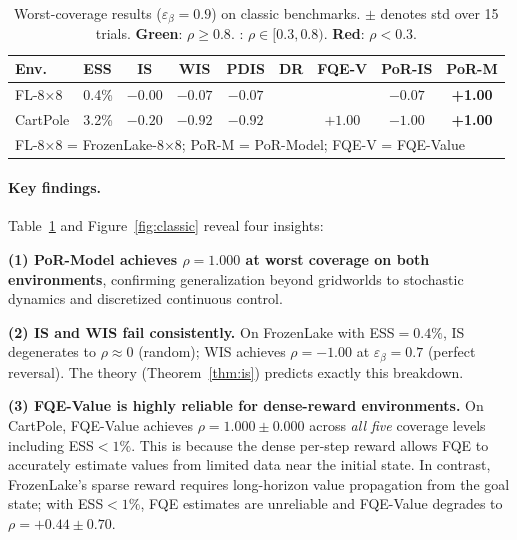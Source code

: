 \documentclass[10pt]{article}
\theoremstyle{plain}
\theoremstyle{definition}
\theoremstyle{remark}
\newcommand{\good}[1]{{\color{goodgreen}\textbf{#1}}}
\newcommand{\bad}[1]{{\color{badred}\textbf{#1}}}
\newcommand{\med}[1]{{\color{medorange}{#1}}}
\begin{document}
\begin{table}[t]
  \centering\small
  \caption{Worst-coverage results ($\varepsilon_\beta=0.9$) on classic benchmarks.
    $\pm$ denotes std over 15 trials.
    \good{Green}: $\rho\geq0.8$.  \med{Orange}: $\rho\in[0.3,0.8)$.
    \bad{Red}: $\rho<0.3$.}
  \label{tab:classic}
  \begin{tabular}{l l c c c c c c c}
    \toprule
    Env. & ESS & IS & WIS & PDIS & DR & FQE-V & PoR-IS & \textbf{PoR-M}\\
    \midrule
    FL-8×8 & 0.4\% &
      \bad{$-0.00$} & \bad{$-0.07$} & \bad{$-0.07$} &
      \med{$+0.47$} & \med{$+0.44$} & \bad{$-0.07$} &
      \good{\textbf{+1.00}} \\
    CartPole & 3.2\% &
      \bad{$-0.20$} & \bad{$-0.92$} & \bad{$-0.92$} &
      \med{$+0.68$} & \good{$+1.00$} & \bad{$-1.00$} &
      \good{\textbf{+1.00}} \\
    \bottomrule
    \multicolumn{9}{l}{\footnotesize FL-8×8 = FrozenLake-8×8; PoR-M = PoR-Model;
      FQE-V = FQE-Value}\\
  \end{tabular}
\end{table}

\paragraph{Key findings.}
Table~\ref{tab:classic} and Figure~\ref{fig:classic} reveal four insights:

\textbf{(1) PoR-Model achieves $\rho=1.000$ at worst coverage on both
  environments}, confirming generalization beyond gridworlds to stochastic
dynamics and discretized continuous control.

\textbf{(2) IS and WIS fail consistently.}  On FrozenLake with
ESS$=0.4\%$, IS degenerates to $\rho\approx0$ (random); WIS achieves
$\rho=-1.00$ at $\varepsilon_\beta=0.7$ (perfect reversal).  The theory
(Theorem~\ref{thm:is}) predicts exactly this breakdown.

\textbf{(3) FQE-Value is highly reliable for dense-reward environments.}
On CartPole, FQE-Value achieves $\rho=1.000\pm0.000$ across \emph{all
five} coverage levels including ESS$<1\%$.  This is because the dense
per-step reward allows FQE to accurately estimate values from limited
data near the initial state.  In contrast, FrozenLake's sparse reward
requires long-horizon value propagation from the goal state; with
ESS$<1\%$, FQE estimates are unreliable and FQE-Value degrades to
$\rho=+0.44\pm0.70$.
\end{document}
